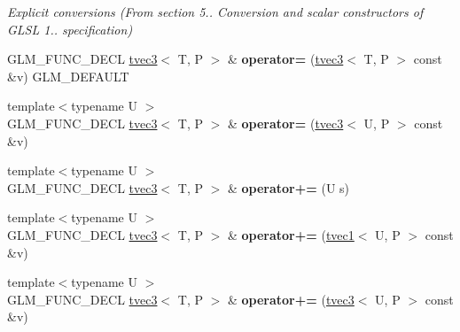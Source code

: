 \begin{DoxyCompactItemize}
\begin{DoxyCompactList}\small\item\em Explicit conversions (From section 5.. Conversion and scalar constructors of G\-L\-S\-L 1.. specification) \end{DoxyCompactList}\item 
\hypertarget{structglm_1_1tvec3_a1da237a73aaa5a05de676d4fead7b0c9}{G\-L\-M\-\_\-\-F\-U\-N\-C\-\_\-\-D\-E\-C\-L \hyperlink{structglm_1_1tvec3}{tvec3}$<$ T, P $>$ \& {\bfseries operator=} (\hyperlink{structglm_1_1tvec3}{tvec3}$<$ T, P $>$ const \&v) G\-L\-M\-\_\-\-D\-E\-F\-A\-U\-L\-T}\label{structglm_1_1tvec3_a1da237a73aaa5a05de676d4fead7b0c9}

\item 
\hypertarget{structglm_1_1tvec3_aff4967c521c4bc8f009eed5db29c9406}{{\footnotesize template$<$typename U $>$ }\\G\-L\-M\-\_\-\-F\-U\-N\-C\-\_\-\-D\-E\-C\-L \hyperlink{structglm_1_1tvec3}{tvec3}$<$ T, P $>$ \& {\bfseries operator=} (\hyperlink{structglm_1_1tvec3}{tvec3}$<$ U, P $>$ const \&v)}\label{structglm_1_1tvec3_aff4967c521c4bc8f009eed5db29c9406}

\item 
\hypertarget{structglm_1_1tvec3_a0a1be09c4b4abe2d89d83c9ed6199abd}{{\footnotesize template$<$typename U $>$ }\\G\-L\-M\-\_\-\-F\-U\-N\-C\-\_\-\-D\-E\-C\-L \hyperlink{structglm_1_1tvec3}{tvec3}$<$ T, P $>$ \& {\bfseries operator+=} (U s)}\label{structglm_1_1tvec3_a0a1be09c4b4abe2d89d83c9ed6199abd}

\item 
\hypertarget{structglm_1_1tvec3_acfd1571d1fab5431b44fdad4d63f3134}{{\footnotesize template$<$typename U $>$ }\\G\-L\-M\-\_\-\-F\-U\-N\-C\-\_\-\-D\-E\-C\-L \hyperlink{structglm_1_1tvec3}{tvec3}$<$ T, P $>$ \& {\bfseries operator+=} (\hyperlink{structglm_1_1tvec1}{tvec1}$<$ U, P $>$ const \&v)}\label{structglm_1_1tvec3_acfd1571d1fab5431b44fdad4d63f3134}

\item 
\hypertarget{structglm_1_1tvec3_aca33e625fbb5231fe04a31a3f6ac7d9c}{{\footnotesize template$<$typename U $>$ }\\G\-L\-M\-\_\-\-F\-U\-N\-C\-\_\-\-D\-E\-C\-L \hyperlink{structglm_1_1tvec3}{tvec3}$<$ T, P $>$ \& {\bfseries operator+=} (\hyperlink{structglm_1_1tvec3}{tvec3}$<$ U, P $>$ const \&v)}\label{structglm_1_1tvec3_aca33e625fbb5231fe04a31a3f6ac7d9c}


\end{DoxyCompactItemize}
